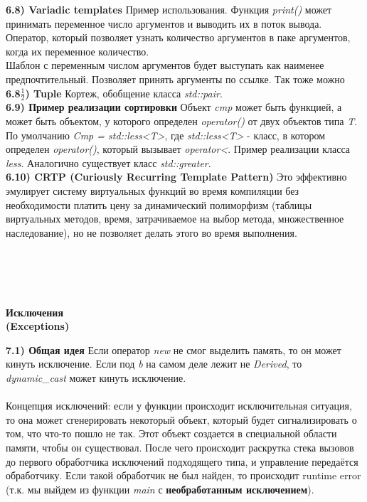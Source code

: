 \documentclass{article}
\begin{document}
\noindent \textbf{6.8) Variadic templates}
Пример использования.
Функция \textit{print()} может принимать переменное число аргументов и выводить их в поток вывода. 
Оператор, который позволяет узнать количество аргументов в паке аргументов, когда их переменное количество.\\
Шаблон с переменным числом аргументов будет выступать как наименее предпочтительный.
Позволяет принять аргументы по ссылке.
Так тоже можно\\
\noindent \textbf{6.8$\frac{1}{2}$) Tuple}
Кортеж, обобщение класса \textit{std::pair}.\\
\noindent \textbf{6.9) Пример реализации сортировки}
Объект \textit{cmp} может быть функцией, а может быть объектом, у которого определен \textit{operator()} от двух объектов типа \textit{T}. По умолчанию \textit{Cmp = std::less<T>}, где \textit{std::less<T>} - класс, в котором определен \textit{operator()}, который вызывает \textit{operator<}.
Пример реализации класса \textit{less}. Аналогично существует класс \textit{std::greater}.\\
\noindent \textbf{6.10) CRTP (Curiously Recurring Template Pattern)}
Это эффективно эмулирует систему виртуальных функций во время компиляции без необходимости платить цену за динамический полиморфизм (таблицы виртуальных методов, время, затрачиваемое на выбор метода, множественное наследование), но не позволяет делать этого во время выполнения. 
\\\\\\\\\\
\begin{center}
	\begin{large}
		\textbf{Исключения\\(Exceptions)}
	\end{large}
\end{center}
\noindent \textbf{7.1) Общая идея}
Если оператор \textit{new} не смог выделить память, то он может кинуть исключение.
Если под \textit{b} на самом деле лежит не \textit{Derived}, то \textit{dynamic\_cast} может кинуть исключение.\\\\
Концепция исключений: если у функции происходит исключительная ситуация, то она может сгенерировать некоторый объект, который будет сигнализировать о том, что что-то пошло не так. Этот объект создается в специальной области памяти, чтобы он существовал. После чего происходит раскрутка стека вызовов до первого обработчика исключений подходящего типа, и управление передаётся обработчику. Если такой обработчик не был найден, то происходит runtime error (т.к. мы выйдем из функции \textit{main} с \textbf{необработанным исключением}).\\
\end{document}

